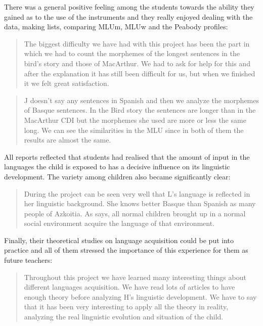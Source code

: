 \documentclass[output=paper]{../langscibook}
\begin{document}


There was a general positive feeling among the students towards the ability they gained as to the use of the instruments and they really enjoyed dealing with the data, making lists, comparing MLUm, MLUw and the Peabody profiles:

\begin{quote}
The biggest difficulty we have had with this project has been the part in which we had to count the morphemes of the longest sentences in the bird’s story and those of MacArthur. We had to ask for help for this and after the explanation it has still been difficult for us, but when we finished it we felt great satisfaction.
\end{quote}

\begin{quote}
J doesn’t say any sentences in Spanish and then we analyze the morphemes of Basque sentences. In the Bird story the sentences are longer than in the MacArthur CDI but the morphemes she used are more or less the same long. We can see the similarities in the MLU since in both of them the results are almost the same.
\end{quote}

All reports reflected that students had realised that the amount of input in the languages the child is exposed to has a decisive influence on its linguistic development. The variety among children also became significantly clear:

\begin{quote}
During the project can be seen very well that L’s language is reflected in her linguistic background. She knows better Basque than Spanish as many people of Azkoitia. As \citet{Palenham2004} says, all normal children brought up in a normal social environment acquire the language of that environment.
\end{quote}

Finally, their theoretical studies on language acquisition could be put into practice and all of them stressed the importance of this experience for them as future teachers:

\begin{quote}
Throughout this project we have learned many interesting things about different languages acquisition. We have read lots of articles to have enough theory before analyzing H’s linguistic development. We have to say that it has been very interesting to apply all the theory in reality, analyzing the real linguistic evolution and situation of the child.  
\end{quote}
\end{document}
